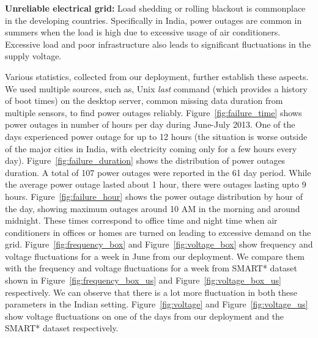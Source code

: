 \documentclass[10pt]{sensys-proc}
\newcommand{\figref}[1]{Figure~\ref{#1}}
\begin{document}
\noindent \textbf{Unreliable electrical grid:} Load shedding or rolling blackout is commonplace in the developing countries. %
Specifically in India, power outages are common in summers when the load is high due to excessive usage of air conditioners. Excessive load and poor infrastructure also leads to significant fluctuations in the supply voltage. %

Various statistics, collected from our deployment, further establish these aspects. We used multiple sources, such as, Unix \emph{last} command (which provides a history of boot times) on the desktop server, common missing data duration from multiple sensors, to find power outages reliably. \figref{fig:failure_time} shows power outages in number of hours per day during June-July 2013. One of the days experienced power outage for up to 12 hours (the situation is worse outside of the major cities in India, with electricity coming only for a few hours every day). \figref{fig:failure_duration} shows the distribution of power outages duration. A total of 107 power outages were reported in the 61 day period. While the average power outage lasted about 1 hour, there were outages lasting upto 9 hours. \figref{fig:failure_hour} shows the power outage distribution by hour of the day, showing maximum outages around 10 AM in the morning and around midnight. These times correspond to office time and night time when air conditioners in offices or homes are turned on leading to excessive demand on the grid. \figref{fig:frequency_box} and \figref{fig:voltage_box} show frequency and voltage fluctuations for a week in June from our deployment. We compare them with the frequency and voltage fluctuations for a week from SMART* dataset shown in \figref{fig:frequency_box_us} and \figref{fig:voltage_box_us} respectively. We can observe that there is a lot more fluctuation in both these parameters in the Indian setting. \figref{fig:voltage} and \figref{fig:voltage_us}  show voltage fluctuations on one of the days from our deployment and the SMART* dataset respectively. 
\end{document}
